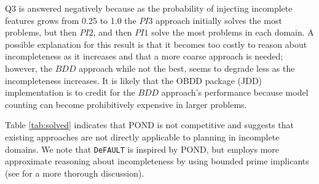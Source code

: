\documentclass[letterpaper]{article}
\def\FFRISKY{{\tt DeFAULT}}
\def\citep#1{\cite{#1}}
\begin{document}
Q3 is answered negatively because as the probability of injecting incomplete
features grows from 0.25 to 1.0 the $PI3$ approach initially solves the most
problems, but then $PI2$, and then $PI1$ solve the most problems in each domain.
A possible explanation for this result is that it becomes too costly to reason
about incompleteness as it increases and that a more coarse approach is needed;
however, the $BDD$ approach while not the best, seems to degrade less as the
incompleteness increases.  It is likely that the OBDD package (JDD)
implementation is to credit for the $BDD$ approach's performance because model
counting can become prohibitively expensive in larger problems.

Table \ref{tab:solved} indicates that POND is not competitive and suggests that
existing approaches are not directly applicable to planning in incomplete
domains.  We note that \FFRISKY{} is inspired by POND, but employs more
approximate reasoning about incompleteness by using bounded prime implicants
(see \citep{USU-CS-TR-11-001} for a more thorough discussion).


       
 
\end{document}
